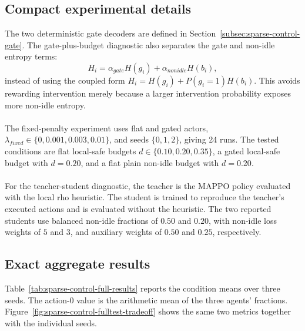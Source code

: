 \subsection{Compact experimental details}
\label{app:sparse-control-method-details}

The two deterministic gate decoders are defined in
Section~\ref{subsec:sparse-control-gate}. The gate-plus-budget diagnostic also
separates the gate and non-idle entropy terms:
\[
  H_i=\alpha_{gate}H(g_i)+\alpha_{nonidle}H(b_i),
\]
instead of using the coupled form
$H_i=H(g_i)+P(g_i=1)H(b_i)$. This avoids rewarding intervention merely because
a larger intervention probability exposes more non-idle entropy.
\\
\\
The fixed-penalty experiment uses flat and gated actors,
$\lambda_{fixed}\in\{0,0.001,0.003,0.01\}$, and seeds
$\{0,1,2\}$, giving 24 runs. The
tested conditions are flat local-safe budgets
$d\in\{0.10,0.20,0.35\}$, a gated local-safe budget with $d=0.20$, and a flat
plain non-idle budget with $d=0.20$.
\\
\\
For the teacher-student diagnostic, the teacher is the MAPPO policy evaluated
with the local rho heuristic. The student is trained to reproduce the
teacher's executed actions and is evaluated without the heuristic. The two
reported students use balanced non-idle fractions of $0.50$ and $0.20$, with
non-idle loss weights of $5$ and $3$, and auxiliary weights of $0.50$ and
$0.25$, respectively.

\subsection{Exact aggregate results}

Table~\ref{tab:sparse-control-full-results} reports the condition means over
three seeds. The action-0 value is the arithmetic mean of the three agents'
fractions. Figure~\ref{fig:sparse-control-fulltest-tradeoff} shows the same two
metrics together with the individual seeds.

